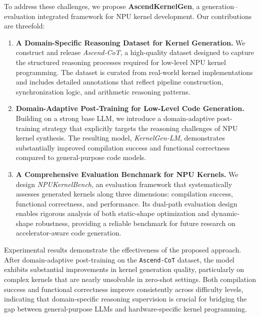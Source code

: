 To address these challenges, we propose \textbf{AscendKernelGen}, a generation--evaluation integrated framework for NPU kernel development. Our contributions are threefold:

\begin{enumerate}
    \item \textbf{A Domain-Specific Reasoning Dataset for Kernel Generation.}
    We construct and release \textit{Ascend-CoT}, a high-quality dataset designed to capture the structured reasoning processes required for low-level NPU kernel programming. The dataset is curated from real-world kernel implementations and includes detailed annotations that reflect pipeline construction, synchronization logic, and arithmetic reasoning patterns.

    \item \textbf{Domain-Adaptive Post-Training for Low-Level Code Generation.}
    Building on a strong base LLM, we introduce a domain-adaptive post-training strategy that explicitly targets the reasoning challenges of NPU kernel synthesis. The resulting model, \textit{KernelGen-LM}, demonstrates substantially improved compilation success and functional correctness compared to general-purpose code models.

    \item \textbf{A Comprehensive Evaluation Benchmark for NPU Kernels.}
    We design \textit{NPUKernelBench}, an evaluation framework that systematically assesses generated kernels along three dimensions: compilation success, functional correctness, and performance. Its dual-path evaluation design enables rigorous analysis of both static-shape optimization and dynamic-shape robustness, providing a reliable benchmark for future research on accelerator-aware code generation.
\end{enumerate}

Experimental results demonstrate the effectiveness of the proposed approach.
After domain-adaptive post-training on the \texttt{Ascend-CoT} dataset, the model exhibits substantial improvements in kernel generation quality, particularly on complex kernels that are nearly unsolvable in zero-shot settings.
Both compilation success and functional correctness improve consistently across difficulty levels, indicating that domain-specific reasoning supervision is crucial for bridging the gap between general-purpose LLMs and hardware-specific kernel programming.

